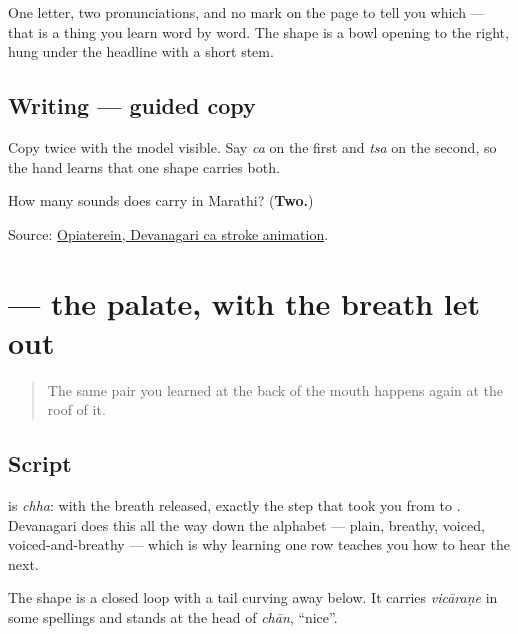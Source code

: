 One letter, two pronunciations, and no mark on the page to tell you which — that is a thing you learn word by word. The shape is a bowl opening to the right, hung under the headline with a short stem.

\subsection*{Writing — guided copy}

Copy \textbf{} twice with the model visible. Say \emph{ca} on the first and \emph{tsa} on the second, so the hand learns that one shape carries both.

\begin{tcolorbox}[breakable,colback=teal!4,colframe=teal!35!black,title={Before you move on}]
How many sounds does \textbf{} carry in Marathi? (\textbf{Two.})

Source: \href{https://commons.wikimedia.org/wiki/File:Deva-\%E0\%A4\%9A-order.gif}{Opiaterein, Devanagari ca stroke animation}.
\end{tcolorbox}
\section[\texorpdfstring{\mr{छ} (cha)}{छ (cha)}]{ — the palate, with the breath let out}

\label{lesson:MR-W06-cha}



\begin{quote}
The same pair you learned at the back of the mouth happens again at the roof of it.
\end{quote}

\subsection*{Script}
\begin{quote}
\end{quote}

\textbf{} is \emph{chha}: \textbf{} with the breath released, exactly the step that took you from \textbf{} to \textbf{}. Devanagari does this all the way down the alphabet — plain, breathy, voiced, voiced-and-breathy — which is why learning one row teaches you how to hear the next.

The shape is a closed loop with a tail curving away below. It carries \emph{vicāraṇe} in some spellings and stands at the head of \emph{chān}, \textquotedblleft{}nice\textquotedblright{}.

